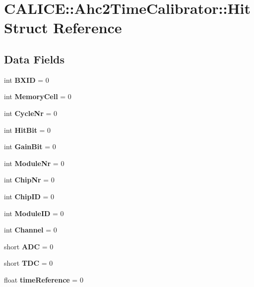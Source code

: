 \section{C\-A\-L\-I\-C\-E\-:\-:Ahc2\-Time\-Calibrator\-:\-:Hit Struct Reference}
\label{structCALICE_1_1Ahc2TimeCalibrator_1_1Hit}
\subsection*{Data Fields}
\begin{DoxyCompactItemize}
\item 
int {\bfseries B\-X\-I\-D} = 0\label{structCALICE_1_1Ahc2TimeCalibrator_1_1Hit_a9521ee5cc3f451e8ce252c2addbdec03}

\item 
int {\bfseries Memory\-Cell} = 0\label{structCALICE_1_1Ahc2TimeCalibrator_1_1Hit_aec3957052ebe5abc3bf90773ead2a4ae}

\item 
int {\bfseries Cycle\-Nr} = 0\label{structCALICE_1_1Ahc2TimeCalibrator_1_1Hit_a3647da8c2def0b2c03a6e6823b9007fa}

\item 
int {\bfseries Hit\-Bit} = 0\label{structCALICE_1_1Ahc2TimeCalibrator_1_1Hit_ad29f4d2d6bf77c12787c3c86f327d845}

\item 
int {\bfseries Gain\-Bit} = 0\label{structCALICE_1_1Ahc2TimeCalibrator_1_1Hit_a191d6c07f9d573e88b768e5cd595db97}

\item 
int {\bfseries Module\-Nr} = 0\label{structCALICE_1_1Ahc2TimeCalibrator_1_1Hit_ae12e9fee470de9daba04f7cbc3b8adf4}

\item 
int {\bfseries Chip\-Nr} = 0\label{structCALICE_1_1Ahc2TimeCalibrator_1_1Hit_a861b9551dbc98786e610e683b464eb3e}

\item 
int {\bfseries Chip\-I\-D} = 0\label{structCALICE_1_1Ahc2TimeCalibrator_1_1Hit_a11861aac201c338f419ce6a05715d5b6}

\item 
int {\bfseries Module\-I\-D} = 0\label{structCALICE_1_1Ahc2TimeCalibrator_1_1Hit_a1fb8417d12cca4344f321074cbff7e23}

\item 
int {\bfseries Channel} = 0\label{structCALICE_1_1Ahc2TimeCalibrator_1_1Hit_aa704b776ce45270395e7ed927437ea77}

\item 
short {\bfseries A\-D\-C} = 0\label{structCALICE_1_1Ahc2TimeCalibrator_1_1Hit_a575fab6e6f3602f2af86fb0b19a66053}

\item 
short {\bfseries T\-D\-C} = 0\label{structCALICE_1_1Ahc2TimeCalibrator_1_1Hit_a47e2321bfb9be5e31190eb33cdc36bf0}

\item 
float {\bfseries time\-Reference} = 0\label{structCALICE_1_1Ahc2TimeCalibrator_1_1Hit_a1fbab4ea5c88f0e50f7c943fd69e0390}

\end{DoxyCompactItemize}


